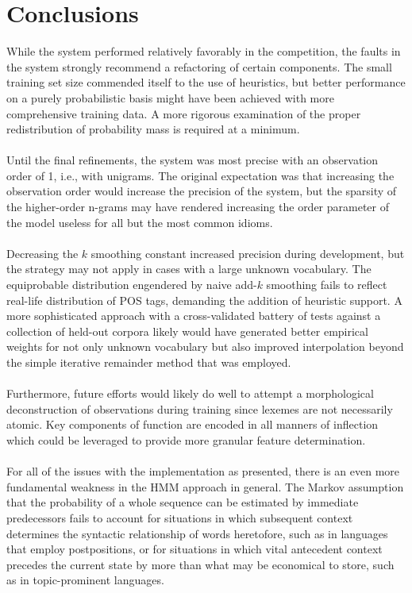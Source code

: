 \documentclass[11pt,a4paper]{article}
\begin{document}
\section{Conclusions}
While the system performed relatively favorably in the competition,
the faults in the system strongly recommend a refactoring of certain
components. The small training set size commended itself to the
use of heuristics, but better performance on a purely probabilistic
basis might have been achieved with more comprehensive training data.
A more rigorous examination of the proper redistribution of probability
mass is required at a minimum.

\paragraph{}
Until the final refinements, the system was most precise with an
observation order of 1, i.e., with unigrams. The original expectation
was that increasing the observation order would increase the precision
of the system, but the sparsity of the higher-order n-grams may have
rendered increasing the order parameter of the model useless
for all but the most common idioms.

\paragraph{}
Decreasing the $k$ smoothing constant increased precision during development,
but the strategy may not apply in cases with a large unknown vocabulary.
The equiprobable distribution engendered by naive add-$k$ smoothing fails to
reflect real-life distribution of POS tags, demanding the addition of heuristic support.
A more sophisticated approach with a cross-validated battery of tests against
a collection of held-out corpora likely would have generated better empirical
weights for not only unknown vocabulary but also improved interpolation beyond the
simple iterative remainder method that was employed.

\paragraph{}
Furthermore, future efforts would likely do well to attempt a morphological deconstruction
of observations during training since lexemes are not necessarily atomic. Key components
of function are encoded in all manners of inflection which could be leveraged to provide
more granular feature determination.

\paragraph{}
For all of the issues with the implementation as presented, there is an even more
fundamental weakness in the HMM approach in general. The Markov assumption that
the probability of a whole sequence can be estimated by immediate predecessors
fails to account for situations in which subsequent context determines the syntactic
relationship of words heretofore, such as in languages that employ postpositions,
or for situations in which vital antecedent context precedes the current state by more
than what may be economical to store, such as in topic-prominent languages.
\end{document}
